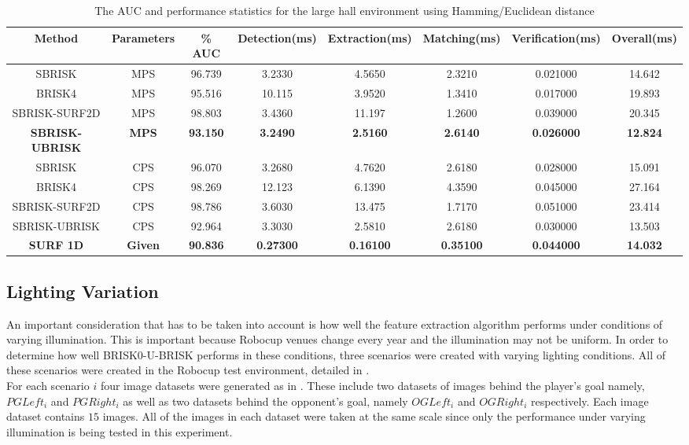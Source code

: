 \documentclass{article}
\begin{document}
\begin{table}
\caption{The AUC and performance statistics for the large hall environment
using Hamming/Euclidean distance}
\footnotesize
\begin{tabular}{|c|c|c|c|c|c|c|c|}
\hline 
\textbf{Method} & \textbf{Parameters} & \textbf{\% AUC} & \textbf{Detection(ms)} & \textbf{Extraction(ms)} & \textbf{Matching(ms)} & \textbf{Verification(ms)} & \textbf{Overall(ms)}\tabularnewline
\hline 
\hline 
SBRISK & MPS & 96.739 & 3.2330 & 4.5650 & 2.3210 & 0.021000 & 14.642\tabularnewline
\hline 
BRISK4 & MPS & 95.516 & 10.115 & 3.9520 & 1.3410 & 0.017000 & 19.893\tabularnewline
\hline 
SBRISK-SURF2D & MPS & 98.803 & 3.4360 & 11.197 & 1.2600 & 0.039000 & 20.345\tabularnewline
\hline 
\textbf{SBRISK-UBRISK} & \textbf{MPS} & \textbf{93.150} & \textbf{3.2490} & \textbf{2.5160} & \textbf{2.6140} & \textbf{0.026000} & \textbf{12.824}\tabularnewline
\hline 
SBRISK & CPS & 96.070 & 3.2680 & 4.7620 & 2.6180 & 0.028000 & 15.091\tabularnewline
\hline 
BRISK4 & CPS & 98.269 & 12.123 & 6.1390 & 4.3590 & 0.045000 & 27.164\tabularnewline
\hline 
SBRISK-SURF2D & CPS & 98.786 & 3.6030 & 13.475 & 1.7170 & 0.051000 & 23.414\tabularnewline
\hline 
SBRISK-UBRISK & CPS & 92.964 & 3.3030 & 2.5810 & 2.6180 & 0.030000 & 13.503\tabularnewline
\hline 
\textbf{SURF 1D} & \textbf{Given} & \textbf{90.836} & \textbf{0.27300} & \textbf{0.16100} & \textbf{0.35100} & \textbf{0.044000} & \textbf{14.032}\tabularnewline
\hline 
\end{tabular}

\end{table}


\subsection{Lighting Variation}
\label{sec:lighting}
An important consideration that has to be taken into account is how well the feature extraction algorithm performs under conditions of varying illumination. This is important because Robocup venues change every year and the illumination may not be uniform. In order to determine how well BRISK0-U-BRISK performs in these conditions, three scenarios were created with varying lighting conditions. All of these scenarios were created in the Robocup test environment, detailed in .\\ 

For each scenario $i$ four image datasets were generated as in . These include  two datasets of images behind the player's goal namely, \textit{$PG Left_{i}$} and \textit{$PG Right_i$} as well as two datasets behind the opponent's goal, namely \textit{$OG Left_i$} and \textit{$OG Right_i$} respectively. Each image dataset contains $15$ images. All of the images in each dataset were taken at the same scale since only the performance under varying illumination is being tested in this experiment.\\ 
\end{document}
